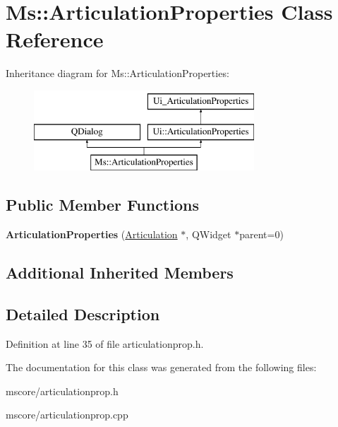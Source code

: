 \hypertarget{class_ms_1_1_articulation_properties}{}\section{Ms\+:\+:Articulation\+Properties Class Reference}
\label{class_ms_1_1_articulation_properties}
Inheritance diagram for Ms\+:\+:Articulation\+Properties\+:\begin{figure}[H]
\begin{center}
\leavevmode
\includegraphics[height=3.000000cm]{class_ms_1_1_articulation_properties}
\end{center}
\end{figure}
\subsection*{Public Member Functions}
\begin{DoxyCompactItemize}
\item 
\mbox{\label{class_ms_1_1_articulation_properties_a78ec573d699daf49eac7b332742a6e5a}} 
{\bfseries Articulation\+Properties} (\hyperlink{class_ms_1_1_articulation}{Articulation} $\ast$, Q\+Widget $\ast$parent=0)
\end{DoxyCompactItemize}
\subsection*{Additional Inherited Members}


\subsection{Detailed Description}


Definition at line 35 of file articulationprop.\+h.



The documentation for this class was generated from the following files\+:\begin{DoxyCompactItemize}
\item 
mscore/articulationprop.\+h\item 
mscore/articulationprop.\+cpp\end{DoxyCompactItemize}
